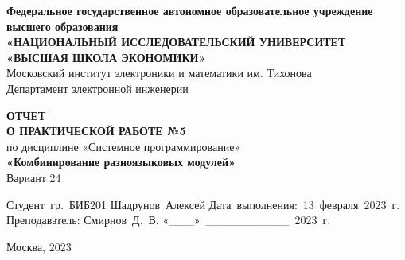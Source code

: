 \begin{titlepage}
        \begin{center}

            \timesfont
            {\large\bf\timesfont Федеральное‌ ‌государственное‌ ‌автономное‌ ‌образовательное‌ ‌учреждение‌ ‌высшего‌ образования\\}
            {\large\bf\timesfont «НАЦИОНАЛЬНЫЙ‌ ‌ИССЛЕДОВАТЕЛЬСКИЙ‌ ‌УНИВЕРСИТЕТ‌ «ВЫСШАЯ‌ ‌ШКОЛА‌ ‌ЭКОНОМИКИ»‌\\}
            Московский‌ ‌институт‌ ‌электроники‌ ‌и‌ ‌математики‌ ‌им. Тихонова‌\\
            Департамент‌ ‌электронной‌ ‌инженерии‌\\

            \vfill
            \vfill

            {\bf\timesfont ОТЧЕТ \\
                О ПРАКТИЧЕСКОЙ РАБОТЕ №5}\\
            по дисциплине «Системное программирование»\\
            {\bf\timesfont «Комбинирование разноязыковых модулей»}\\
            Вариант 24\\


            \vfill
            \vfill
            \vfill

            \hfill\vbox
            {
                \hbox{Студент гр. БИБ201}
                \hbox{Шадрунов Алексей}
                \hbox{Дата выполнения: 13 февраля 2023 г.}
                \hbox{}
                \hbox{Преподаватель:}
                \hbox{Смирнов Д. В.}
                \hbox{«\_\_\_» \_\_\_\_\_\_\_\_\_\_ 2023 г.}
            }

            \vfill

            Москва, 2023
        \end{center}
\end{titlepage}
